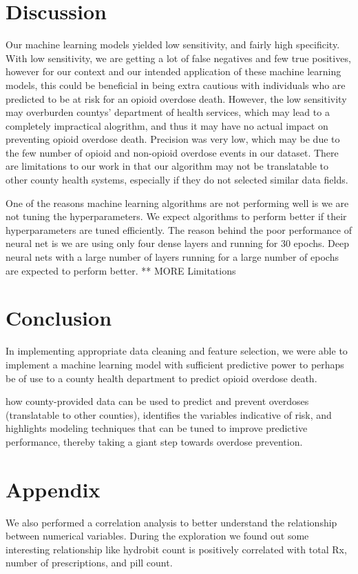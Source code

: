 \documentclass[twoside,10.5pt]{article}
\begin{document}
\section{Discussion}
Our machine learning models yielded low sensitivity, and fairly high specificity. With low sensitivity, we are getting a lot of false negatives and few true positives, however for our context and our intended application of these machine learning models, this could be beneficial in being extra cautious with individuals who are predicted to be at risk for an opioid overdose death. However, the low sensitivity may overburden countys' department of health services, which may lead to a completely impractical alogrithm, and thus it may have no actual impact on preventing opioid overdose death. Precision was very low, which may be due to the few number of opioid and non-opioid overdose events in our dataset. 
There are limitations to our work in that our algorithm may not be translatable to other county health systems, especially if they do not selected similar data fields.

One of the reasons machine learning algorithms are not performing well is we are not tuning the hyperparameters. We expect algorithms to perform better if their hyperparameters are tuned efficiently. The reason behind the poor performance of neural net is we are using only four dense layers and running for 30 epochs. Deep neural nets with a large number of layers running for a large number of epochs are expected to perform better. 
** MORE Limitations 

\section{Conclusion}
In implementing appropriate data cleaning and feature selection, we were able to implement a machine learning model with sufficient predictive power to perhaps be of use to a county health department to predict opioid overdose death. 

how county-provided data can be used to predict and prevent overdoses (translatable to other counties), identifies the variables indicative of risk, and highlights modeling techniques that can be tuned to improve predictive performance, thereby taking a giant step towards overdose prevention. 

\newpage
\appendix
\section*{Appendix}
We also performed a correlation analysis to better understand the relationship between numerical variables. During the exploration we found out some interesting relationship like hydrobit count is positively correlated with total Rx, number of prescriptions, and pill count.
\end{document}

